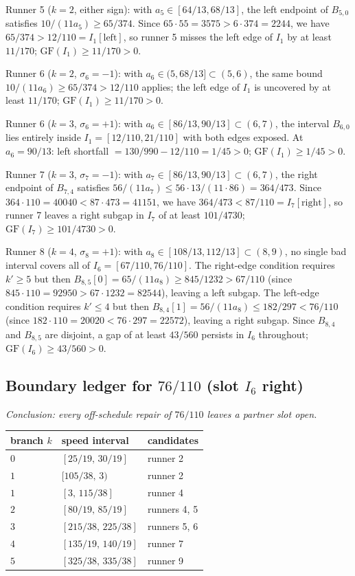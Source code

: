 \documentclass[12pt]{article}
\begin{document}
Runner 5 ($k=2$, either sign): with $a_5\in[64/13,68/13]$, the left endpoint of $B_{5,0}$
satisfies $10/(11a_5)\ge 65/374$. Since $65\cdot55=3575>6\cdot374=2244$, we have
$65/374>12/110=I_1[\text{left}]$, so runner 5 misses the left edge of $I_1$ by at least
$11/170$; $\mathrm{GF}(I_1)\ge 11/170>0$.

Runner 6 ($k=2$, $\sigma_6=-1$): with $a_6\in(5,68/13]\subset(5,6)$, the same bound
$10/(11a_6)\ge 65/374>12/110$ applies; the left edge of $I_1$ is uncovered by at least
$11/170$; $\mathrm{GF}(I_1)\ge 11/170>0$.

Runner 6 ($k=3$, $\sigma_6=+1$): with $a_6\in[86/13,90/13]\subset(6,7)$, the interval
$B_{6,0}$ lies entirely inside $I_1=[12/110,21/110]$ with both edges exposed. At
$a_6=90/13$: left shortfall $=130/990-12/110=1/45>0$; $\mathrm{GF}(I_1)\ge 1/45>0$.

Runner 7 ($k=3$, $\sigma_7=-1$): with $a_7\in[86/13,90/13]\subset(6,7)$, the right
endpoint of $B_{7,4}$ satisfies $56/(11a_7)\le 56\cdot13/(11\cdot86)=364/473$. Since
$364\cdot110=40040<87\cdot473=41151$, we have $364/473<87/110=I_7[\text{right}]$, so
runner 7 leaves a right subgap in $I_7$ of at least $101/4730$;
$\mathrm{GF}(I_7)\ge 101/4730>0$.

Runner 8 ($k=4$, $\sigma_8=+1$): with $a_8\in[108/13,112/13]\subset(8,9)$, no single bad
interval covers all of $I_6=[67/110,76/110]$. The right-edge condition requires $k'\ge5$
but then $B_{8,5}[0]=65/(11a_8)\ge 845/1232>67/110$ (since
$845\cdot110=92950>67\cdot1232=82544$), leaving a left subgap. The left-edge condition
requires $k'\le4$ but then $B_{8,4}[1]=56/(11a_8)\le 182/297<76/110$ (since
$182\cdot110=20020<76\cdot297=22572$), leaving a right subgap. Since $B_{8,4}$ and
$B_{8,5}$ are disjoint, a gap of at least $43/560$ persists in $I_6$ throughout;
$\mathrm{GF}(I_6)\ge 43/560>0$.

\subsection{Boundary ledger for $76/110$ (slot $I_6$ right)}

\emph{Conclusion: every off-schedule repair of $76/110$ leaves a partner slot open.}

\begin{center}
\begin{tabular}{@{}lll@{}}
\toprule
branch $k$ & speed interval & candidates \\
\midrule
$0$ & $[25/19,\,30/19]$ & runner 2 \\
$1$ & $[105/38,\,3)$ & runner 2 \\
$1$ & $[3,\,115/38]$ & runner 4 \\
$2$ & $[80/19,\,85/19]$ & runners 4, 5 \\
$3$ & $[215/38,\,225/38]$ & runners 5, 6 \\
$4$ & $[135/19,\,140/19]$ & runner 7 \\
$5$ & $[325/38,\,335/38]$ & runner 9 \\
\bottomrule
\end{tabular}
\end{center}
\end{document}
